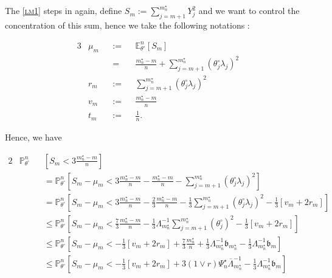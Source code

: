 The \textsc{\cref{lm1}} steps in again, define $S_{m} := \sum\limits_{j = m + 1}^{m_{n}^{\star}} Y_{j}^{2}$ and we want to control the concentration of this sum, hence we take the following notations :

\begin{alignat*}{3}
& \mu_{m} && := && \mathds{E}_{\theta^{\circ}}^{n}\left[S_{m}\right]\\
& && = && \frac{m_{n}^{\star} - m}{n} + \sum\limits_{j = m+1}^{m_{n}^{\star}}\left(\theta^{\circ}_{j}\lambda_{j}\right)^{2}\\
& r_{m} && := && \sum\limits_{j = m+1}^{m_{n}^{\star}}\left(\theta^{\circ}_{j}\lambda_{j}\right)^{2}\\
& v_{m} && := && \frac{m_{n}^{\star} - m}{n}\\
& t_{m} && := && \frac{1}{n}.
\end{alignat*}

Hence, we have

\begin{alignat*}{2}
& \mathds{P}_{\theta^{\circ}}^{n} && \left[S_{m} < 3 \frac{m_{n}^{\star} - m}{n}\right] \\
& && = \mathds{P}_{\theta^{\circ}}^{n}\left[S_{m} - \mu_{m} < 3 \frac{m_{n}^{\star} - m}{n} - \frac{m_{n}^{\star} - m}{n} - \sum\limits_{j = m+1}^{m_{n}^{\star}}\left(\theta^{\circ}_{j}\lambda_{j}\right)^{2}\right]\\
& && = \mathds{P}_{\theta^{\circ}}^{n}\left[S_{m} - \mu_{m} < 3 \frac{m_{n}^{\star} - m}{n} - \frac{2}{3} \frac{m_{n}^{\star} - m}{n} - \frac{1}{3}\sum\limits_{j = m+1}^{m_{n}^{\star}}\left(\theta^{\circ}_{j}\lambda_{j}\right)^{2} - \frac{1}{3} \left[v_{m} + 2 r_{m}\right]\right]\\
& && \leq \mathds{P}_{\theta^{\circ}}^{n}\left[S_{m} - \mu_{m} < \frac{7}{3} \frac{m_{n}^{\star} - m}{n} - \frac{1}{3} \Lambda_{m_{n}^{\star}}^{-1}\sum\limits_{j = m+1}^{m_{n}^{\star}}\left(\theta^{\circ}_{j}\right)^{2} - \frac{1}{3} \left[v_{m} + 2 r_{m}\right]\right]\\
& && \leq \mathds{P}_{\theta^{\circ}}^{n}\left[S_{m} - \mu_{m} <  - \frac{1}{3} \left[v_{m} + 2 r_{m}\right] + \frac{7}{3} \frac{m_{n}^{\star}}{n} + \frac{1}{3} \Lambda_{m_{n}^{\star}}^{-1}\mathfrak{b}_{m_{n}^{\star}} - \frac{1}{3} \Lambda_{m_{n}^{\star}}^{-1}\mathfrak{b}_{m}\right]\\
& && \leq \mathds{P}_{\theta^{\circ}}^{n}\left[S_{m} - \mu_{m} < - \frac{1}{3} \left[v_{m} + 2 r_{m}\right] + 3 \left(1 \vee r\right) \Psi_{n}^{\star} \overline{\Lambda}_{m_{n}^{\star}}^{-1} - \frac{1}{3}\Lambda_{m_{n}^{\star}}^{-1}\mathfrak{b}_{m}\right]
\end{alignat*}

